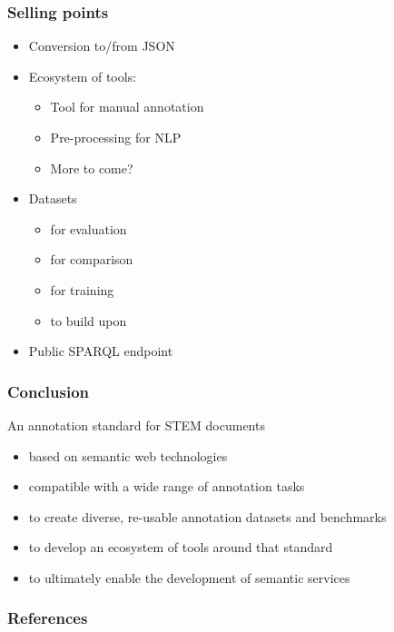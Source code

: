 \documentclass[aspectratio=169]{beamer}
\begin{document}
\begin{frame}
    \frametitle{Selling points}
    \begin{itemize}
        \item Conversion to/from JSON
        \item Ecosystem of tools:
            \begin{itemize}
                \item Tool for manual annotation
                \item Pre-processing for NLP
                \item More to come?
            \end{itemize}
        \item Datasets
            \begin{itemize}
                \item for evaluation
                \item for comparison
                \item for training
                \item to build upon
            \end{itemize}
        \item Public SPARQL endpoint
    \end{itemize}
\end{frame}


\begin{frame}
    \frametitle{Conclusion}
    An annotation standard for STEM documents
    \begin{itemize}
        \item based on semantic web technologies
        \item compatible with a wide range of annotation tasks
        \item to create diverse, re-usable annotation datasets and benchmarks
        \item to develop an ecosystem of tools around that standard
        \item to ultimately enable the development of semantic services
    \end{itemize}
\end{frame}


\begin{frame}[allowframebreaks,t]
    \frametitle{References}
    \printbibliography
\end{frame}
\end{document}
